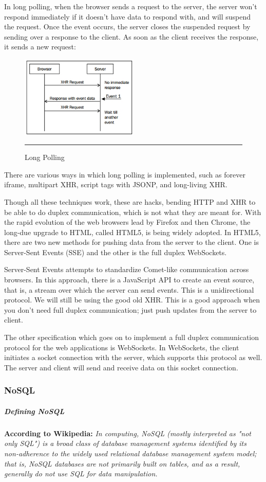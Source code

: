 In long polling, when the browser sends a request to the server, the server won't
respond immediately if it doesn't have data to respond with, and will suspend the
request. Once the event occurs, the server closes the suspended request by sending
over a response to the client. As soon as the client receives the response, it sends a
new request:
\begin{figure}[h!]
  \centering
    \includegraphics[width=0.5\textwidth]{./Pictures/long_poling.jpg}
  \rule{0.5\textwidth}{1pt}
  \caption{Long Polling}
\end{figure}
There are various ways in which long polling is implemented, such as forever iframe,
multipart XHR, script tags with JSONP, and long-living XHR.

Though all these techniques work, these are hacks, bending HTTP and XHR to be
able to do duplex communication, which is not what they are meant for.
With the rapid evolution of the web browsers lead by Firefox and then Chrome, the
long-due upgrade to HTML, called HTML5, is being widely adopted. In HTML5,
there are two new methods for pushing data from the server to the client. One is
Server-Sent Events (SSE) and the other is the full duplex WebSockets.

Server-Sent Events attempts to standardize Comet-like communication across
browsers. In this approach, there is a JavaScript API to create an event source, that is,
a stream over which the server can send events. This is a unidirectional protocol. We
will still be using the good old XHR. This is a good approach when you don't need
full duplex communication; just push updates from the server to client.

The other specification which goes on to implement a full duplex communication
protocol for the web applications is WebSockets. In WebSockets, the client initiates
a socket connection with the server, which supports this protocol as well. The server
and client will send and receive data on this socket connection.
\subsubsection{NoSQL}
\subparagraph*{Defining NoSQL}
\hfill \break
\textbf{According to Wikipedia:}
\textit{In computing, NoSQL (mostly interpreted as "not only SQL") is a broad
class of database management systems identified by its non-adherence to the
widely used relational database management system model; that is, NoSQL
databases are not primarily built on tables, and as a result, generally do not
use SQL for data manipulation.}


